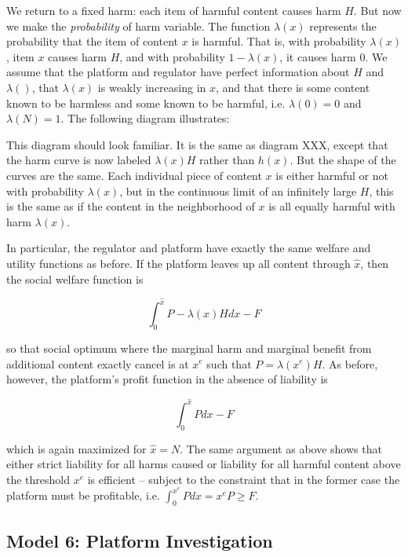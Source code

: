 We return to a fixed harm: each item of harmful content causes harm $H$. But now we make the \emph{probability} of harm variable. The function $\lambda(x)$ represents the probability that the item of content $x$ is harmful. That is, with probability $\lambda(x)$, item $x$ causes harm $H$, and with probability $1 - \lambda(x)$, it causes harm $0$. We assume that the platform and regulator have perfect information about $H$ and $\lambda()$, that $\lambda(x)$ is weakly increasing in $x$, and that there is some content known to be harmless and some known to be harmful, i.e. $\lambda(0) = 0$ and $\lambda(N) = 1$. The following diagram illustrates:


This diagram should look familiar. It is the same as diagram XXX, except that the harm curve is now labeled $\lambda(x)H$ rather than $h(x)$. But the shape of the curves are the same. Each individual piece of content $x$ is either harmful or not with probability $\lambda(x)$, but in the continuous limit of an infinitely large $H$, this is the same as if the content in the neighborhood of $x$ is all equally harmful with harm $\lambda(x)$.

In particular, the regulator and platform have exactly the same welfare and utility functions as before.  If the platform leaves up all content through $\hat{x}$, then the social welfare function is

\begin{equation}
\int_{0}^{\hat{x}} P - \lambda(x)H dx - F
\end{equation}

so that social optimum where the marginal harm and marginal benefit from additional content exactly cancel is at $x^e$ such that $P = \lambda(x^e)H$. As before, however, the platform's profit function in the absence of liability is

\begin{equation}
\int_{0}^{\hat{x}} P dx - F
\end{equation} 

which is again maximized for $\hat{x} = N$. The same argument as above shows that either strict liability for all harms caused or liability for all harmful content above the threshold $x^e$ is efficient -- subject to the constraint that in the former case the platform must be profitable, i.e. $\int_0^{x^e} P dx = x^eP \ge F$.


\subsection{Model 6: Platform Investigation}


